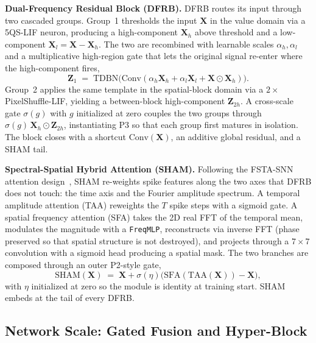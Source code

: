 \documentclass[conference]{IEEEtran}
\newcommand{\DFRB}{\textsc{DFRB}}
\newcommand{\SHAM}{\textsc{SHAM}}
\begin{document}
\textbf{Dual-Frequency Residual Block (\DFRB{}).} \DFRB{} routes
its input through two cascaded groups. Group~1 thresholds the
input $\mathbf{X}$ in the value domain via a 5QS-LIF neuron,
producing a high-component $\mathbf{X}_h$ above threshold and a
low-component $\mathbf{X}_l\!=\!\mathbf{X}\!-\!\mathbf{X}_h$. The
two are recombined with learnable scales $\alpha_h,\alpha_l$ and a
multiplicative high-region gate that lets the original signal
re-enter where the high-component fires,
\begin{equation}
\mathbf{Z}_1
\;=\;
\mathrm{TDBN}\bigl(\mathrm{Conv}(
\alpha_h\mathbf{X}_h+\alpha_l\mathbf{X}_l+\mathbf{X}\odot\mathbf{X}_h)\bigr).
\label{eq:dfrb-g1}
\end{equation}
Group~2 applies the same template in the spatial-block domain via
a $2\!\times$ PixelShuffle-LIF, yielding a between-block
high-component $\mathbf{Z}_{2h}$. A cross-scale gate $\sigma(g)$
with $g$ initialized at zero couples the two groups through
$\sigma(g)\,\mathbf{X}_h\!\odot\!\mathbf{Z}_{2h}$, instantiating P3
so that each group first matures in isolation. The block closes
with a shortcut $\mathrm{Conv}(\mathbf{X})$, an additive global
residual, and a \SHAM{} tail.

\textbf{Spectral-Spatial Hybrid Attention (\SHAM{}).} Following the
FSTA-SNN attention design~\cite{ref:fstasnn2025}, \SHAM{} re-weights
spike features along the two axes that \DFRB{} does not touch: the
time axis and the Fourier amplitude spectrum. A temporal
amplitude attention (TAA) reweights the $T$ spike steps with a
sigmoid gate. A spatial frequency attention (SFA) takes the 2D real
FFT of the temporal mean, modulates the magnitude with a
\texttt{FreqMLP}, reconstructs via inverse FFT (phase preserved so
that spatial structure is not destroyed), and projects through a
$7\!\times\!7$ convolution with a sigmoid head producing a spatial
mask. The two branches are composed through an outer P2-style gate,
\begin{equation}
\mathrm{SHAM}(\mathbf{X})
\;=\;
\mathbf{X}+\sigma(\eta)\bigl(\mathrm{SFA}(\mathrm{TAA}(\mathbf{X}))-\mathbf{X}\bigr),
\label{eq:sham}
\end{equation}
with $\eta$ initialized at zero so the module is identity at
training start. \SHAM{} embeds at the tail of every \DFRB{}.

\subsection{Network Scale: Gated Fusion and Hyper-Block}
\label{sec:framework-network}
\end{document}
